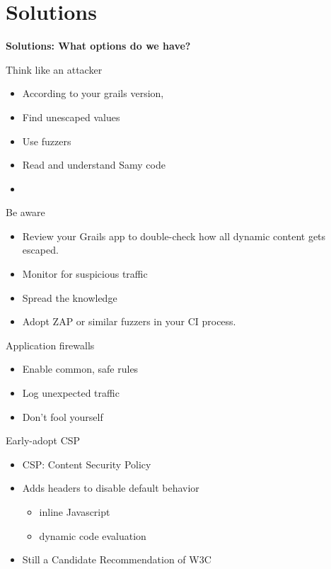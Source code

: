 
\section{Solutions}

\begin{frame}[plain]
    \begin{center}
      \Huge\bfseries
      Solutions: What options do we have?
    \end{center}
\end{frame}

\begin{frame}{Think like an attacker}
  \begin{itemize}[<+-| alert@+>]
    \item According to your grails version, 
    \item Find unescaped values
    \item Use fuzzers
    \item Read and understand Samy code
    \item 
  \end{itemize}
\end{frame}

\begin{frame}{Be aware}
  \begin{itemize}[<+-| alert@+>]
    \item Review your Grails app to double-check how all dynamic content gets escaped.
    \item Monitor for suspicious traffic
    \item Spread the knowledge
    \item Adopt ZAP or similar fuzzers in your CI process.
  \end{itemize}
\end{frame}

\begin{frame}{Application firewalls}
 \begin{itemize}[<+-| alert@+>]
   \item Enable common, safe rules
   \item Log unexpected traffic
   \item Don't fool yourself
 \end{itemize}
\end{frame}

\begin{frame}{Early-adopt CSP}
 \begin{itemize}[<+-| alert@+>]
  \item CSP: Content Security Policy
  \item Adds headers to disable default behavior
   \begin{itemize}[<+-| alert@+>]
     \item inline Javascript
     \item dynamic code evaluation
   \end{itemize}
   \item Still a Candidate Recommendation of W3C
 \end{itemize}
\end{frame}
